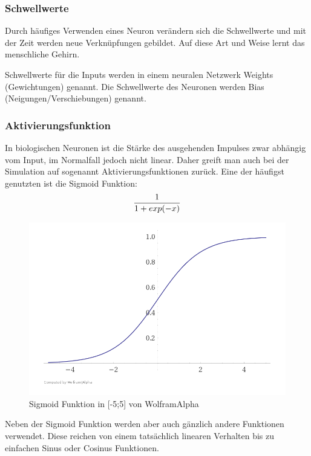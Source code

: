 \documentclass[11pt, twocolumn]{article}
\begin{document}
\subsubsection{Schwellwerte}
Durch häufiges Verwenden eines Neuron verändern sich die Schwellwerte und mit der Zeit werden neue Verknüpfungen gebildet. Auf diese Art und Weise lernt das menschliche Gehirn.

Schwellwerte für die Inputs werden in einem neuralen Netzwerk Weights (Gewichtungen) genannt. Die Schwellwerte des Neuronen werden Bias (Neigungen/Verschiebungen) genannt.

\subsubsection{Aktivierungsfunktion}
In biologischen Neuronen ist die Stärke des ausgehenden Impulses zwar abhängig vom Input, im Normalfall jedoch nicht linear. Daher greift man auch bei der Simulation auf sogenannt Aktivierungsfunktionen zurück. Eine der häufigst genutzten ist die Sigmoid Funktion:
\begin{equation}
	\centering
	\frac{1}{1 + exp(-x)}
\end{equation}

\begin{figure}
	\includegraphics[width=\linewidth]{Sigmoid.png}
	\caption{Sigmoid Funktion in [-5;5] von WolframAlpha}
	\label{fig:sigmoid}
\end{figure}

Neben der Sigmoid Funktion werden aber auch gänzlich andere Funktionen verwendet. Diese reichen von einem tatsächlich linearen Verhalten bis zu einfachen Sinus oder Cosinus Funktionen.
\end{document}
